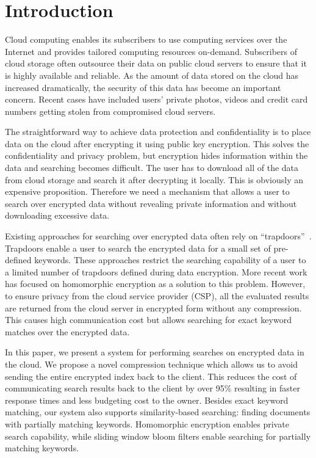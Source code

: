 \section{Introduction}

Cloud computing enables its subscribers to use computing services over the 
Internet and provides tailored computing resources on-demand. 
Subscribers of cloud storage often outsource their data on public cloud servers
to ensure that it is highly available and reliable. 
As the amount of data stored on the cloud has increased dramatically, the security 
of this data has become an important concern. Recent cases
have included users' private photos, videos and credit card numbers 
getting stolen from compromised cloud servers. 

The straightforward way to achieve data protection and confidentiality is to
place data on the cloud after encrypting it using public key encryption.
This solves the confidentiality and privacy problem,
but encryption hides information within the data and searching becomes 
difficult. The user
has to download all of the data from cloud storage and search it after 
decrypting it locally. 
This is
obviously an expensive proposition. Therefore we need a mechanism 
that allows a user to search over encrypted data without revealing 
private information and without downloading excessive data.

Existing approaches for searching over encrypted data often rely on
``trapdoors''~\cite{song,goh2003secure,boneh}. 
Trapdoors enable a user to search the encrypted data for a small 
set of pre-defined keywords. These approaches restrict the searching
capability of a user to a limited number of trapdoors defined during data 
encryption. More recent work has focused on homomorphic encryption \cite{craig} as a solution
to this problem. However, to ensure privacy from the cloud service provider (CSP), 
all the evaluated results
are returned from the cloud server in encrypted form without any compression. This causes high
communication cost but allows searching for exact keyword matches over the encrypted data.

In this paper, we present a system for performing searches on encrypted 
data in the cloud. We propose a novel compression technique which allows us to
avoid sending the entire encrypted index back to the client. This reduces
the cost of communicating search results back to the client by over 95\% resulting in 
faster response times and less budgeting cost to the owner. 
Besides exact keyword matching, our system also
supports similarity-based searching: finding documents with partially matching 
keywords. Homomorphic encryption enables private search capability, 
while sliding window 
bloom filters enable searching for partially matching keywords. 

